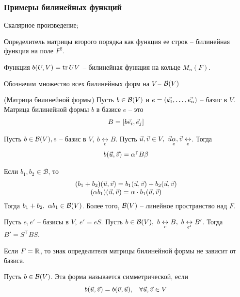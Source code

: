 \begin{multicols}{2}
\subsubsection*{Примеры билинейных функций}
\begin{enumerate*}
    \item Скалярное произведение;
    \item Определитель матрицы второго порядка как функция ее строк -- билинейная функция на поле $F^2$.
    \item Функция $b(U,V) = \operatorname{tr} UV$ -- билинейная функция на кольце $M_n(F)$.
\end{enumerate*}
Обозначим множество всех билинейных форм на $V$ -- $\mathcal{B}(V)$
\begin{definition}{(Матрица билинейной формы)}{}
    Пусть $b \in \mathcal{B}(V)$ и $e = (\vec{e_1}, \ldots, \vec{e_n})$ -- базис в $V$. Матрица билинейной формы $b$ в базисе $e$ -- это 
    \[ 
        B = [b{\vec{e}_i, \vec{e}_j}]
    \]
\end{definition}
\begin{proposition}{}{}
    Пусть $b\in \mathcal{B}(V), e$ -- базис в $V,\  b \underset{e}{\leftrightarrow} B$. Пусть $\vec{u}, \vec{v} \in V, \ \vec{u} \underset{e}{\alpha}, \vec{v} \underset{e}{\leftrightarrow}$. Тогда 
    \[
        b(\vec{u}, \vec{v}) = \alpha^\intercal B\beta
        \]
\end{proposition}
\begin{note}{}{}
    Если $b_1, b_2 \in \mathcal{B}$, то 
    \[
        \begin{array}{c}
            (b_1 + b_2)(\vec{u}, \vec{v}) = b_1(\vec{u}, \vec{v}) + b_2(\vec{u}, \vec{v})\\
            (\alpha b_1)(\vec{u}, \vec{v}) = \alpha\cdot b_1(\vec{u}, \vec{v})
        \end{array}
    \]
    Тогда $b_1 + b_2, \ \alpha b_1 \in \mathcal{B}(V)$. Более того, $\mathcal{B} (V)$ -- линейное пространство над $F$.
\end{note}
\begin{theorema}{}{}
    Пусть $e, e'$ -- базисы в $V, \ e'=eS$. Пусть $b \in \calB(V), \ b\underset{e}{\leftrightarrow}B, \ b\underset{e'}{\leftrightarrow} B'$. Тогда $B'=S^\intercal BS.$ 
\end{theorema}
\begin{note}{}{}
    Если $F=\mathbb{R}$, то знак определителя матрицы билинейной формы не зависит от базиса.
\end{note}
\begin{definition}{}{}
    Пусть $b\in \mathcal{B}(V)$. Эта форма называется симметрической, если
    \[
        b(\vec{u}, \vec{v}) = b(\vec{v}, \vec{u}), \hspace*{0.3cm} \forall \vec{u}, \vec{v} \in V
\]
\end{definition}
\end{multicols}
